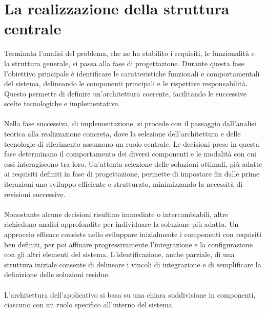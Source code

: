 \chapter{La realizzazione della struttura centrale}

Terminata l'analisi del problema, che ne ha stabilito i requisiti, le funzionalità e la struttura generale,
si passa alla fase di progettazione.
Durante questa fase l'obiettivo principale è identificare le caratteristiche funzionali e comportamentali del sistema,
delineando le componenti principali e le rispettive responsabilità.
Questo permette di definire un'architettura coerente,
facilitando le successive scelte tecnologiche e implementative.\\
\\
Nella fase successiva, di implementazione,
si procede con il passaggio dall’analisi teorica alla realizzazione concreta,
dove la selezione dell’architettura e delle tecnologie di riferimento assumono un ruolo centrale.
Le decisioni prese in questa fase determinano il comportamento dei diversi componenti e
le modalità con cui essi interagiscono tra loro.
Un’attenta selezione delle soluzioni ottimali, più adatte ai requisiti definiti in fase di progettazione,
permette di impostare fin dalle prime iterazioni uno sviluppo efficiente e strutturato,
minimizzando la necessità di revisioni successive.\\
\\
Nonostante alcune decisioni risultino immediate o intercambiabili,
altre richiedono analisi approfondite per individuare la soluzione più adatta.
Un approccio efficace consiste nello sviluppare inizialmente i componenti con requisiti ben definiti,
per poi affinare progressivamente l'integrazione e la configurazione con gli altri elementi del sistema.
L'identificazione, anche parziale, di una struttura iniziale consente di delineare i vincoli di integrazione e
di semplificare la definizione delle soluzioni residue.\\
\\
L’architettura dell’applicativo si basa su una chiara suddivisione in componenti,
ciascuno con un ruolo specifico all’interno del sistema.
\\

